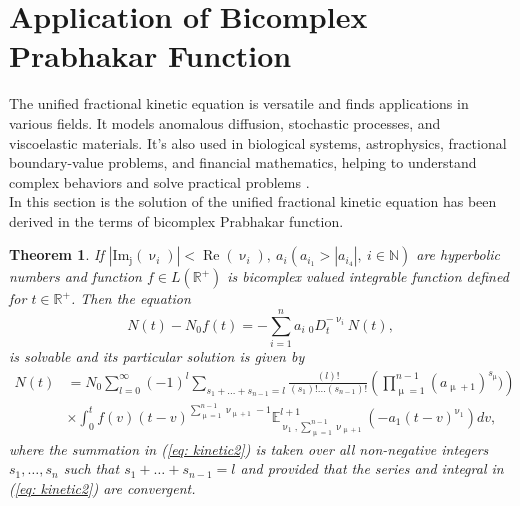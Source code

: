 \documentclass[a4paper,12pt]{article}
\newtheorem{theorem}{Theorem}[section]
\theoremstyle{remark}
\begin{document}
\section{Application of Bicomplex Prabhakar Function}
	

\noindent The unified fractional kinetic equation is versatile and finds applications in various fields. It models anomalous diffusion, stochastic processes, and viscoelastic materials. It's also used in biological systems, astrophysics, fractional boundary-value problems, and financial mathematics, helping to understand complex behaviors and solve practical problems \cite{saichev1997}.\\
In this section is  the solution of
the unified fractional kinetic equation has been derived in the terms of bicomplex Prabhakar function. %
\begin{theorem}
	If $|\operatorname{Im_j}(\upnu_i)|<\operatorname{Re}(\upnu_i),~ a_i (a_{i_1}> |a_{i_4}|,~i\in\mathbb{N})$ are hyperbolic numbers   and function   $f\in L(\mathbb{R}^+)$ is bicomplex valued integrable function defined for $t\in\mathbb{R}^+$. Then the equation
	\begin{equation}\label{eq: kinetic1}
	N(t)-N_0f(t)=-\sum_{i=1}^{n}{a_i}~  _0D^{-\upnu_i}_tN(t),
	\end{equation}
	is solvable and its particular solution is given by
	\begin{equation}\label{eq: kinetic2}
	\begin{split}
		N(t)&= N_0\sum_{l=0}^{\infty}(-1)^l \sum_{s_1+\dots+s_{n-1}=l}\frac{(l)!}{(s_1)!\dots(s_{n-1})!}\left( \prod_{\upmu=1}^{n-1}(a_{\upmu+1})^{s_\upmu})\right) \\
	&\times \int_{0}^{t}f(v)(t-v)^{\sum_{\upmu=1}^{n-1}\upnu_{\upmu +1}-1}\mathbb{E}_{\upnu_1,\sum_{\upmu=1}^{n-1}\upnu_{\upmu +1}}^{l+1} \left( -a_1(t-v)^{\upnu_1}\right) dv,
	\end{split}
	\end{equation}
where the summation in (\ref{eq: kinetic2}) is taken over all non-negative integers $s_1,\dots ,s_n$ such that $s_1+\dots +s_{n-1}=l$ and provided that the series and integral in (\ref{eq: kinetic2}) are convergent. 
\end{theorem}
\end{document}
